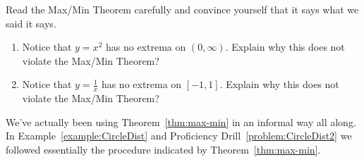 \begin{ProficiencyDrill}
  Read the Max/Min Theorem carefully and convince yourself that it
  says what we said it says.
\end{ProficiencyDrill}

  \begin{embeddedproblem}{}
    \begin{enumerate}[label={\bf{}(\alph*)}]
    \item Notice that $y=x^2$ has no extrema on $(0,\infty).$ Explain
      why this does not violate the Max/Min Theorem?
    \item Notice that $y=\frac{1}{x}$ has no extrema on $[-1,1].$
      Explain why this does not violate the Max/Min Theorem?
    \end{enumerate}
  \end{embeddedproblem}

We've actually been using Theorem~\ref{thm:max-min} in an informal way
all along.  In Example~\ref{example:CircleDist} and Proficiency
Drill~\ref{problem:CircleDist2} we followed essentially the procedure
indicated by Theorem~\ref{thm:max-min}.



